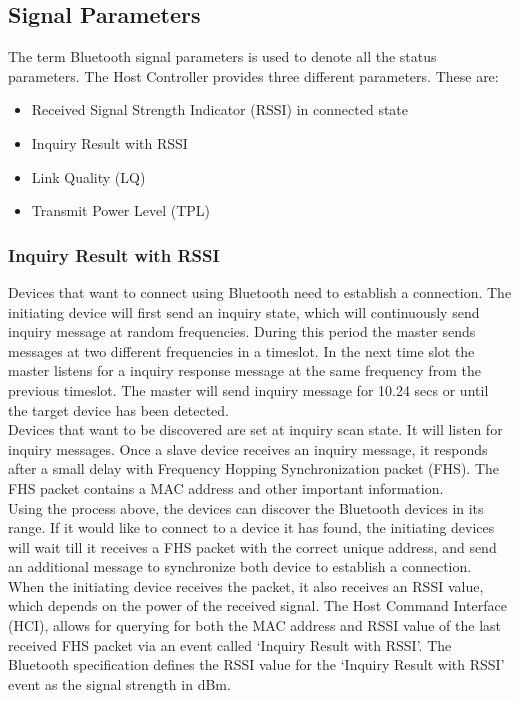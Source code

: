 \documentclass[12pt]{article}
\begin{document}
\subsection{Signal Parameters}

The term Bluetooth signal parameters is used to denote all the status parameters. The Host Controller provides three different parameters. These are:

\begin{itemize}
  \item Received Signal Strength Indicator (RSSI) in connected state
  \item Inquiry Result with RSSI
  \item Link Quality (LQ)
  \item Transmit Power Level (TPL)
\end{itemize}

\subsubsection{Inquiry Result with RSSI}
Devices that want to connect using Bluetooth need to establish a connection. The initiating device will first send an inquiry state, which will continuously send inquiry message at random frequencies. During this period the master sends messages at two different frequencies in a timeslot. In the next time slot the master listens for a inquiry response message at the same frequency from the previous timeslot. The master will send inquiry message for 10.24 secs or until the target device has been detected. \\

Devices that want to be discovered are set at inquiry scan state. It will listen for inquiry messages. Once a slave device receives an inquiry message, it responds after a small delay with Frequency Hopping Synchronization packet (FHS). The FHS packet contains a MAC address and other important information. \\

Using the process above, the devices can discover the Bluetooth devices in its range. If it would like to connect to a device it has found, the initiating devices will wait till it receives a FHS packet with the correct unique address, and send an additional message to synchronize both device to establish a connection. When the initiating device receives the packet, it also receives an RSSI value, which depends on the power of the received signal. The Host Command Interface (HCI), allows for querying for both the MAC address and RSSI value of the last received FHS packet via an event called `Inquiry Result with RSSI'. The Bluetooth specification defines the RSSI value for the `Inquiry Result with RSSI' event as the signal strength in dBm. \\
\end{document}
